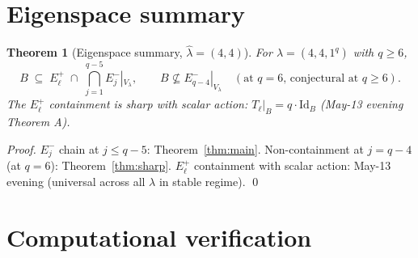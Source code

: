 \documentclass[11pt]{article}
\newtheorem{theorem}{Theorem}
\theoremstyle{definition}
\newcommand{\hatl}{\widehat\lambda}
\begin{document}
\section{Eigenspace summary}\label{sec:summary}

\begin{theorem}[Eigenspace summary, $\hatl = (4, 4)$]\label{thm:summary}
For $\lambda = (4, 4, 1^q)$ with $q \ge 6$,
\[
   B \;\subseteq\; E_\ell^+\;\cap\;\bigcap_{j=1}^{q-5} E_j^-|_{V_\lambda},
   \qquad
   B \not\subseteq E_{q-4}^-|_{V_\lambda}
   \quad (\text{at $q = 6$, conjectural at $q \ge 6$}).
\]
The $E_\ell^+$ containment is sharp with scalar action: $T_\ell|_B
= q\cdot \mathrm{Id}_B$ (May-13 evening Theorem A).
\end{theorem}

\begin{proof}
$E_j^-$ chain at $j \le q - 5$: Theorem~\ref{thm:main}.
Non-containment at $j = q - 4$ (at $q = 6$): Theorem~\ref{thm:sharp}.
$E_\ell^+$ containment with scalar action: May-13 evening (universal
across all $\lambda$ in stable regime).
\qed
\end{proof}

\section{Computational verification}\label{sec:verify}
\end{document}
